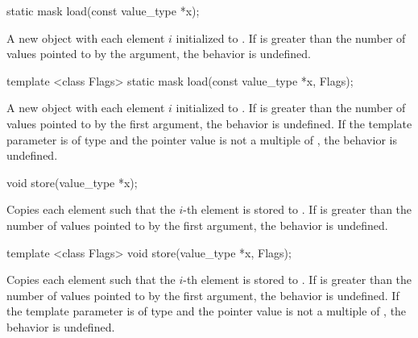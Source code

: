 \begin{itemdecl}
static mask load(const value_type *x);
\end{itemdecl}
\begin{itemdescr}
  \pnum \returns A new \mask object with each element $i$ initialized to  \foralli.
  \pnum \remarks If \mask{} is greater than the number of values pointed to by the argument, the behavior is undefined.
\end{itemdescr}

\begin{itemdecl}
template <class Flags> static mask load(const value_type *x, Flags);
\end{itemdecl}
\begin{itemdescr}
  \pnum\returns A new \mask object with each element $i$ initialized to  \foralli.
  \pnum\remarks If \mask{} is greater than the number of values pointed to by the first argument, the behavior is undefined.
  \pnum\remarks If the template parameter is of type  and the pointer value is not a multiple of , the behavior is undefined.
\end{itemdescr}

\begin{itemdecl}
void store(value_type *x);
\end{itemdecl}
\begin{itemdescr}
  \pnum\effects Copies each element such that the $i$-th element is stored to .
  \pnum\remarks If \mask{} is greater than the number of values pointed to by the first argument, the behavior is undefined.
\end{itemdescr}

\begin{itemdecl}
template <class Flags> void store(value_type *x, Flags);
\end{itemdecl}
\begin{itemdescr}
  \pnum\effects Copies each element such that the $i$-th element is stored to .
  \pnum\remarks If \mask{} is greater than the number of values pointed to by the first argument, the behavior is undefined.
  \pnum\remarks If the template parameter is of type  and the pointer value is not a multiple of , the behavior is undefined.
\end{itemdescr}

